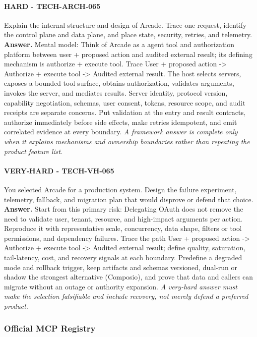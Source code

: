 \paragraph{HARD - TECH-ARCH-065} Explain the internal structure and design of Arcade. Trace one request, identify the control plane and data plane, and place state, security, retries, and telemetry.
\textbf{Answer.} Mental model: Think of Arcade as a agent tool and authorization platform between user + proposed action and audited external result; its defining mechanism is authorize + execute tool. Trace User + proposed action -> Authorize + execute tool -> Audited external result. The host selects servers, exposes a bounded tool surface, obtains authorization, validates arguments, invokes the server, and mediates results. Server identity, protocol version, capability negotiation, schemas, user consent, tokens, resource scope, and audit receipts are separate concerns. Put validation at the entry and result contracts, authorize immediately before side effects, make retries idempotent, and emit correlated evidence at every boundary.
\textit{A framework answer is complete only when it explains mechanisms and ownership boundaries rather than repeating the product feature list.}
\paragraph{VERY-HARD - TECH-VH-065} You selected Arcade for a production system. Design the failure experiment, telemetry, fallback, and migration plan that would disprove or defend that choice.
\textbf{Answer.} Start from this primary risk: Delegating OAuth does not remove the need to validate user, tenant, resource, and high-impact arguments per action. Reproduce it with representative scale, concurrency, data shape, filters or tool permissions, and dependency failures. Trace the path User + proposed action -> Authorize + execute tool -> Audited external result; define quality, saturation, tail-latency, cost, and recovery signals at each boundary. Predefine a degraded mode and rollback trigger, keep artifacts and schemas versioned, dual-run or shadow the strongest alternative (Composio), and prove that data and callers can migrate without an outage or authority expansion.
\textit{A very-hard answer must make the selection falsifiable and include recovery, not merely defend a preferred product.}
\subsubsection*{Official MCP Registry}
